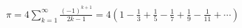 \documentclass[preview]{standalone}
\begin{document}
\begin{align*}
\pi = 4 \sum_{k=1}^{\infty} \frac{(-1)^{k+1}}{2k - 1} = 4 \left( 1 - \frac{1}{3} + \frac{1}{5} - \frac{1}{7} + \frac{1}{9} - \frac{1}{11} + \cdots \right)
\end{align*}
\end{document}
